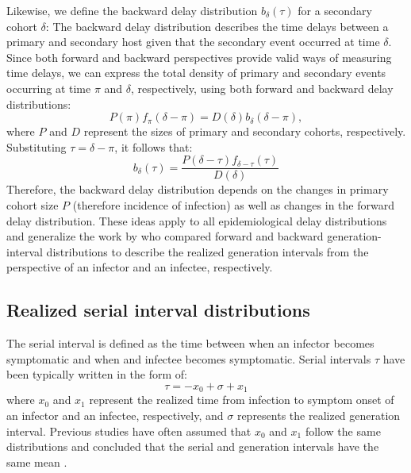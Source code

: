 \documentclass[12pt]{article}
\newcommand{\comment}{\showcomment}
\newcommand{\showcomment}[3]{\textcolor{#1}{\textbf{[#2: }\textsl{#3}\textbf{]}}}
\newcommand{\jd}[1]{\comment{cyan}{JD}{#1}}
\begin{document}
Likewise, we define the backward delay distribution $b_\delta(\tau)$ for a secondary cohort $\delta$:
The backward delay distribution describes the time delays between a primary and secondary host given that the secondary event occurred at time $\delta$.
Since both forward and backward perspectives provide valid ways of measuring time delays, we can express the total density of primary and secondary events occurring at time $\pi$ and $\delta$, respectively, using both forward and backward delay distributions:
\begin{equation}
P(\pi) f_\pi(\delta-\pi) = D(\delta) b_\delta(\delta-\pi),
\end{equation}
where $P$ and $D$ represent the sizes of primary and secondary cohorts, respectively.
Substituting $\tau = \delta - \pi$, it follows that:
\begin{equation}
b_\delta(\tau) = \frac{P(\delta-\tau) f_{\delta-\tau}(\tau)}{D(\delta)}
\end{equation}
Therefore, the backward delay distribution depends on the changes in primary cohort size $P$ (therefore incidence of infection) as well as changes in the forward delay distribution.
These ideas apply to all epidemiological delay distributions and generalize the work by \citep{champredon2015intrinsic} who compared forward and backward generation-interval distributions to describe the realized generation intervals from the perspective of an infector and an infectee, respectively.

\subsection{Realized serial interval distributions}

The serial interval is defined as the time between when an infector becomes symptomatic and when and infectee becomes symptomatic.
Serial intervals $\tau$ have been typically written in the form of:
\begin{equation}
\tau = - x_0 + \sigma + x_1
\end{equation}
where $x_0$ and $x_1$ represent the realized time from infection to symptom onset of an infector and an infectee, respectively, and $\sigma$ represents the realized generation interval.
Previous studies have often assumed that $x_0$ and $x_1$ follow the same distributions and concluded that the serial and generation intervals have the same mean \citep{svensson2007note,klinkenberg2011correlation,champredon2018equivalence, britton2019estimation}.
\end{document}
